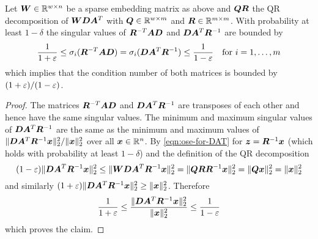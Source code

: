 \begin{theorem}
Let \(\bm{W} \in \mathbb{R}^{w \times n}\) be a sparse embedding matrix as above and \(\bm{Q}\bm{R}\) the QR decomposition of \(\bm{W}\bm{D}\bm{A}^T\) with \(\bm{Q} \in \mathbb{R}^{w \times m}\) and \(\bm{R} \in \mathbb{R}^{m \times m}\). With probability at least \(1 - \delta\) the singular values of \(\bm{R}^{-T}\bm{A}\bm{D}\) and \(\bm{D}\bm{A}^T \bm{R}^{-1}\) are bounded by
\[ \frac{1}{1 + \varepsilon} \leq \sigma_i(\bm{R}^{-T}\bm{A}\bm{D}) = \sigma_i(\bm{D}\bm{A}^T \bm{R}^{-1}) \leq \frac{1}{1 - \varepsilon} \quad \text{for } i = 1, \ldots, m \]
which implies that the condition number of both matrices is bounded by \((1 + \varepsilon)/(1 - \varepsilon)\).
\end{theorem}
\begin{proof}
The matrices \(\bm{R}^{-T}\bm{A}\bm{D}\) and \(\bm{D}\bm{A}^T \bm{R}^{-1}\) are transposes of each other and hence have the same singular values.
The minimum and maximum singular values of \(\bm{D}\bm{A}^T \bm{R}^{-1}\) are the same as the minimum and maximum values of \( \lVert \bm{D}\bm{A}^T \bm{R}^{-1} \bm{x} \rVert_2^2 / \lVert \bm{x} \rVert_2^2\) over all \(\bm{x} \in \mathbb{R}^n\).
By \cref{eqn:ose-for-DAT} for \(\bm{z} = \bm{R}^{-1} \bm{x}\) (which holds with probability at least \(1 - \delta\)) and the definition of the QR decomposition
\[
  (1-\varepsilon) \lVert \bm{D}\bm{A}^T \bm{R}^{-1} \bm{x} \rVert_2^2
  \leq \lVert \bm{W}\bm{D}\bm{A}^T \bm{R}^{-1}\bm{x} \rVert_2^2
  = \lVert \bm{Q}\bm{R} \bm{R}^{-1}\bm{x} \rVert_2^2
  = \lVert \bm{Q}\bm{x} \rVert_2^2
  = \lVert \bm{x} \rVert_2^2
\]
and similarly \((1+\varepsilon)\lVert \bm{D}\bm{A}^T \bm{R}^{-1} \bm{x} \rVert_2^2 \geq \lVert \bm{x} \rVert_2^2\).
Therefore
\[ \frac{1}{1 + \varepsilon} \leq \frac{\lVert \bm{D}\bm{A}^T \bm{R}^{-1} \bm{x} \rVert_2^2}{\lVert \bm{x} \rVert_2^2} \leq \frac{1}{1 - \varepsilon} \]
which proves the claim.
\end{proof}
